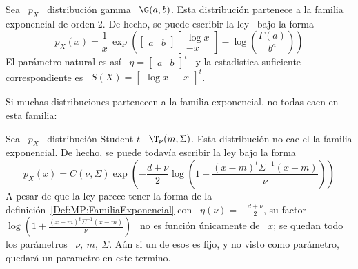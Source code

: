 \begin{ejemplo}
  Sea \ $p_X$ \ distribuci\'on gamma \ $\G(a,b)$.  Esta distribuci\'on partenece
  a la familia exponencial  de orden $2$.  De hecho, se puede  escribir la ley \
  bajo la forma
  \[
  p_X(x)     =    \frac{1}{x}    \,     \exp\left(    \begin{bmatrix}     a    &
      b \end{bmatrix} \begin{bmatrix}  \log x \\ - x  \end{bmatrix} - \log\left(
      \frac{\Gamma(a)}{b^a} \right)\right)
  \]
  El   par\'ametro  natural   es   as\'i   \  $\eta   =   \begin{bmatrix}  a   &
    b \end{bmatrix}^t$ \ y la  estadistica suficiente correspondiente es \ $S(X)
  = \begin{bmatrix} \log x & - x \end{bmatrix}^t$.
\end{ejemplo}

Si muchas distribuciones  partenecen a la familia exponencial,  no todas caen en
esta familia:
%
\begin{ejemplo}
  Sea  \   $p_X$  \   distribuci\'on  Student-$t$  \   $\T_\nu(m,\Sigma)$.  Esta
  distribuci\'on no cae el la  familia exponencial. De hecho, se puede todav\'ia
  escribir la ley bajo la forma
  \[
  p_X(x)   =  C(\nu,\Sigma)   \exp\left(  -   \frac{d+\nu}{2}  \log\left(   1  +
      \frac{(x-m)^t \Sigma^{-1} (x-m)}{\nu} \right) \right)
  \]
  A    pesar   de    que    la   ley    parece    tener   la    forma   de    la
  definici\'on~\ref{Def:MP:FamiliaExponencial}    con   \    $\eta(\nu)    =   -
  \frac{d+\nu}{2}$,  su  factor  \  $\log\left( 1  +  \frac{(x-m)^t  \Sigma^{-1}
      (x-m)}{\nu} \right)$  \ no es funci\'on  \'unicamente de \  $x$; se quedan
  todo los par\'ametros \ $\nu, \: m, \: \Sigma$. A\'un si un de esos es fijo, y
  no visto como par\'ametro, quedar\'a un parametro en este termino.
\end{ejemplo}


